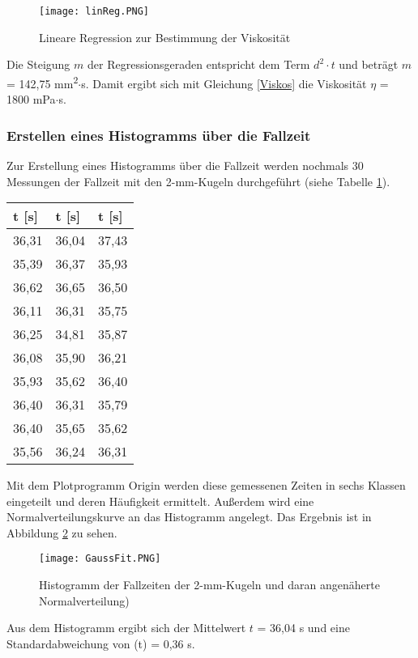 \documentclass{scrartcl}
\begin{document}
\begin{figure}[H]
  \centering
    \texttt{[image: linReg.PNG]}
  \caption{Lineare Regression zur Bestimmung der Viskosität}
  \label{fig:linReg}
\end{figure}
Die Steigung $m$ der Regressionsgeraden entspricht dem Term $d^2 \cdot t$ und beträgt $m$ = 142,75 mm\textsuperscript{2}$\cdot$s. Damit ergibt sich mit Gleichung \ref{Viskos} die Viskosität $\eta$ = 1800 mPa$\cdot$s.
\subsubsection{Erstellen eines Histogramms über die Fallzeit}
Zur Erstellung eines Histogramms über die Fallzeit werden nochmals 30 Messungen der Fallzeit mit den 2-mm-Kugeln durchgeführt (siehe Tabelle \ref{tab:Gauss}).
\begin{table}[H]
\begin{center}
\begin{tabular}{l|l|l}
t [s]  &  t [s]  &  t [s] \\
\hline
36,31 & 36,04 & 37,43 \\ 
35,39 & 36,37 & 35,93 \\
36,62 & 36,65 & 36,50 \\
36,11 & 36,31 & 35,75 \\
36,25 & 34,81 & 35,87 \\
36,08 & 35,90 & 36,21 \\
35,93 & 35,62 & 36,40 \\
36,40 & 36,31 & 35,79 \\
36,40 & 35,65 & 35,62 \\
35,56 & 36,24 & 36,31 \\
\end{tabular}
\end{center}
\label{tab:Gauss}
\end{table}
Mit dem Plotprogramm Origin werden diese gemessenen Zeiten in sechs Klassen eingeteilt und deren Häufigkeit ermittelt. Außerdem wird eine Normalverteilungskurve an das Histogramm angelegt. Das Ergebnis ist in Abbildung \ref{fig:GaussFit} zu sehen.
\begin{figure}[H]
  \centering
    \texttt{[image: GaussFit.PNG]}
  \caption{Histogramm der Fallzeiten der 2-mm-Kugeln und daran angenäherte Normalverteilung)}
  \label{fig:GaussFit}
\end{figure}
Aus dem Histogramm ergibt sich der Mittelwert $t$ = 36,04 s und eine Standardabweichung von \textsigma(t) = 0,36 s.
\end{document}
